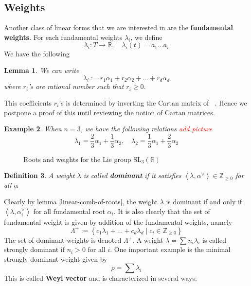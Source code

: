 \documentclass[12pt]{article} %
\newtheorem{definition}{Definition}[section]
\newtheorem{lemma}[definition]{Lemma}
\newtheorem{example}[definition]{Example}
\DeclareMathOperator{\slnr}{\mathfrak{sl}_n(\mathbb{R})}
\begin{document}
\subsection{Weights}
Another class of linear forms that we are interested in are the \textbf{fundamental weights}. For each fundamental
weights $\lambda_i$, we define
\[\lambda_i \colon T \to \mathbb{R}, \quad\lambda_i(t) = a_1\ldots a_i\]
We have the following
\begin{lemma}\label{linear-comb-of-weights}
    We can write
    \[\lambda_i := r_1\alpha_1 + r_2\alpha_2+\ldots + r_d\alpha_d\]
    where $r_i$'s are rational number such that $r_i \ge 0$.
\end{lemma}
This coefficients $r_i$'s is determined by inverting the Cartan matrix of $\slnr$. Hence we postpone a proof
of this until reviewing the notion of Cartan matrices.
\begin{example}
    When $n=3$, we have the following relations \textcolor{red}{add picture}
    \[\lambda_1 = \dfrac{2}{3}\alpha_1+\dfrac{1}{3}\alpha_2, \quad \lambda_2 = \dfrac{1}{3}\alpha_1+\dfrac{2}{3}\alpha_2\]
\end{example}
\begin{figure}[h]
    \centering
    \caption{Roots and weights for the Lie group $\text{SL}_3(\mathbb{R})$}
\end{figure}


\begin{definition}
    A weight $\lambda$ is called \textbf{dominant} if it satisfies $\left\langle \lambda,\alpha^{\vee} \right\rangle \in \mathbb{Z}_{\ge 0}$ for all $\alpha$
\end{definition}
Clearly by lemma \ref{linear-comb-of-roots}, the weight $\lambda$ is dominant if and only if $\left\langle\lambda,\alpha_i^\vee\right\rangle$ for all
fundamental root $\alpha_i$. It is also clearly that the set of fundamental weight is given by addition of the fundamental weights, namely
\[\Lambda^+ := \left\lbrace c_1\lambda_1+\ldots+c_d\lambda_d \mid c_i \in \mathbb{Z}_{\ge 0}\right\rbrace\]
The set of dominant weights is denoted $\Lambda^+$. A weight $\lambda = \sum n_i \lambda_i$ is called strongly dominant if $n_i > 0$ for all $i$. One important example is the minimal strongly dominant weight given by
\[
    \rho = \sum \lambda_i
\]
This is called \textbf{Weyl vector} and is characterized in several ways:
\end{document}
